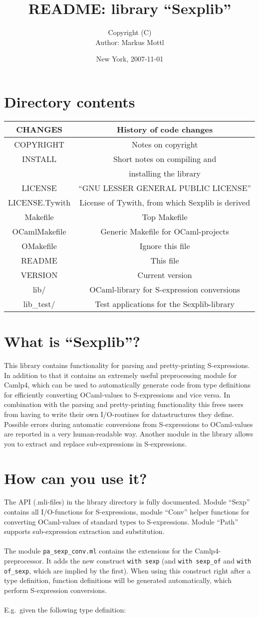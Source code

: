 \documentclass[a4paper]{article}
\title{README: library ``Sexplib''}
\author{
  Copyright \quad (C) \quad \theyear \quad \janeshort \quad\\
  Author: Markus Mottl
}
\date{New York, 2007-11-01}
\newcommand{\trow}[2]{\quad #1 \quad&\quad #2 \quad\\}
\newcommand{\trowl}[2]{\trow{#1}{#2}\hline}
\begin{document}
\maketitle
\section{Directory contents}
\begin{center}
\begin{tabular}{|c|c|}
\hline
\trowl{CHANGES}{History of code changes}
\trowl{COPYRIGHT}{Notes on copyright}
\trow{INSTALL}{Short notes on compiling and}
\trowl{}{installing the library}
\trowl{LICENSE}{``GNU LESSER GENERAL PUBLIC LICENSE''}
\trowl{LICENSE.Tywith}{License of Tywith, from which Sexplib is derived}
\trowl{Makefile}{Top Makefile}
\trowl{OCamlMakefile}{Generic Makefile for OCaml-projects}
\trowl{OMakefile}{Ignore this file}
\trowl{README}{This file}
\trowl{VERSION}{Current version}
\trowl{lib/}{OCaml-library for S-expression conversions}
\trowl{lib\_test/}{Test applications for the Sexplib-library}
\end{tabular}
\end{center}

\section{What is ``Sexplib''?}

This library contains functionality for parsing and pretty-printing
S-expressions.  In addition to that it contains an extremely useful
preprocessing module for Camlp4, which can be used to automatically
generate code from type definitions for efficiently converting
OCaml-values to S-expressions and vice versa.  In combination with the
parsing and pretty-printing functionality this frees users from having to
write their own I/O-routines for datastructures they define.  Possible
errors during automatic conversions from S-expressions to OCaml-values
are reported in a very human-readable way.  Another module in the library
allows you to extract and replace sub-expressions in S-expressions.

\section{How can you use it?}

The API (.mli-files) in the library directory is fully documented.  Module
``Sexp'' contains all I/O-functions for S-expressions, module ``Conv'' helper
functions for converting OCaml-values of standard types to S-expressions.
Module ``Path'' supports sub-expression extraction and substitution.\\
\\
The module \verb=pa_sexp_conv.ml= contains the extensions for the
Camlp4-preprocessor.  It adds the new construct \verb=with sexp=
(and \verb=with sexp_of= and \verb=with of_sexp=, which are implied by
the first).  When using this construct right after a type definition,
function definitions will be generated automatically, which perform
S-expression conversions.\\
\\
E.g.\ given the following type definition:
\end{document}
